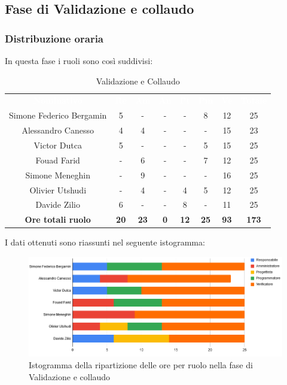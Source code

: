 
\subsection{Fase di Validazione e collaudo}
\subsubsection{Distribuzione oraria}
In questa fase i ruoli sono così suddivisi:

\begin{table}[H]
\centering\renewcommand{\arraystretch}{1.5}
\caption{Validazione e Collaudo}
\vspace{0.2cm}
\begin{tabular}{ c c c c c c c c }
\rowcolor{redafk}
\textcolor{white}{\textbf{Nominativo}} & \textcolor{white}{\textbf{Re}} & 
\textcolor{white}{\textbf{Am}} & \textcolor{white}{\textbf{An}} &
\textcolor{white}{\textbf{Pt}} & \textcolor{white}{\textbf{Pm}} &
\textcolor{white}{\textbf{Ve}} & \textcolor{white}{\textbf{Totale}} \\
Simone Federico Bergamin 	& 5 	& - 	& - 	& - 	& 8 	& 12 	& 25 \\
Alessandro Canesso 			& 4 	& 4 	& - 	& - 	& - 	& 15 	& 23 \\
Victor Dutca 				& 5 	& - 	& - 	& - 	& 5 	& 15 	& 25 \\
Fouad Farid					& - 	& 6 	& - 	& - 	& 7 	& 12 	& 25 \\
Simone Meneghin 			& - 	& 9 	& - 	& - 	& - 	& 16 	& 25 \\
Olivier Utshudi 			& - 	& 4 	& - 	& 4 	& 5 	& 12 	& 25 \\
Davide Zilio 				& 6 	& - 	& - 	& 8 	& - 	& 11 	& 25 \\
\rowcolor{lastrowcolor}
\textbf{Ore totali ruolo} & \textbf{20} & \textbf{23} & \textbf{0} & \textbf{12} & \textbf{25} & \textbf{93} & \textbf{173} \\
\end{tabular}
\end{table}

I dati ottenuti sono riassunti nel seguente istogramma: 
\begin{figure}[H]
\centering
\includegraphics[scale=0.60]{img/grafici/tabella_fase_val_col.png}
\caption{Istogramma della ripartizione delle ore per ruolo nella fase di Validazione e collaudo}
\end{figure}


